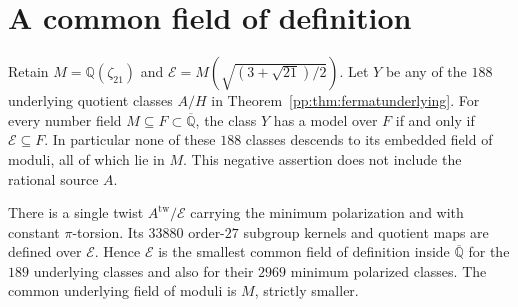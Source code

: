 \section{A common field of definition}
\begin{theorem}
\label{pp:thm:quotientdefinitionfield}
Retain $M=\mathbb Q(\zeta_{21})$ and
$\mathcal E=M(\sqrt{(3+\sqrt{21})/2})$.
Let $Y$ be any of the $188$ underlying quotient classes $A/H$ in
Theorem~\ref{pp:thm:fermatunderlying}. For every number field
$M\subseteq F\subset\overline{\mathbb Q}$, the class $Y$ has a
model over $F$ if and only if $\mathcal E\subseteq F$.
In particular none of these $188$ classes descends to its embedded
field of moduli, all of which lie in $M$. This negative assertion
does not include the rational source $A$.

There is a single twist $A^{\mathrm{tw}}/\mathcal E$ carrying the
minimum polarization and with constant $\pi$-torsion. Its $33880$
order-$27$ subgroup kernels and quotient maps are defined over
$\mathcal E$. Hence $\mathcal E$ is the smallest common field of
definition inside $\overline{\mathbb Q}$ for the $189$ underlying
classes and also for their $2969$ minimum polarized classes.
The common underlying field of moduli is $M$, strictly smaller.
\end{theorem}
